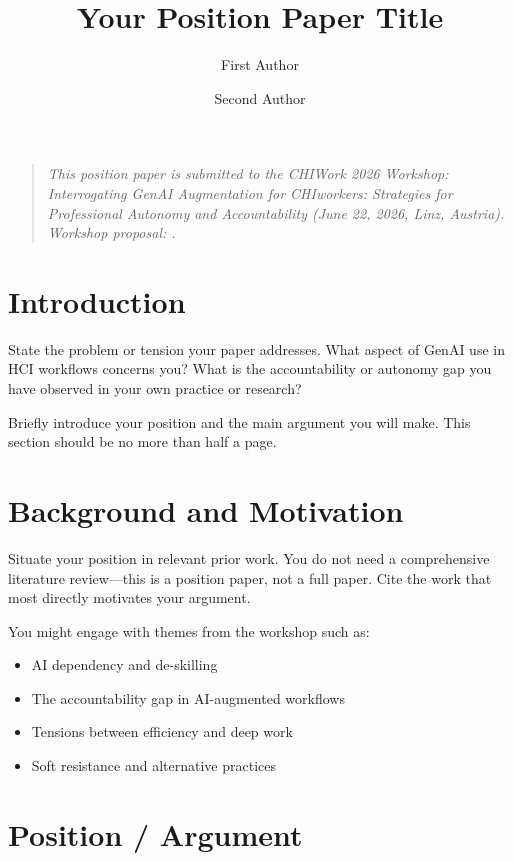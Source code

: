 \documentclass[sigconf]{acmart}
\title{Your Position Paper Title}
\author{First Author}
\affiliation{%
  \institution{Your Institution}
  \city{City}
  \country{Country}}
\author{Second Author}
\affiliation{%
  \institution{Second Institution}
  \city{City}
  \country{Country}}
\newcommand{\workshopNote}{%
  \begin{quote}
    \small\itshape
    This position paper is submitted to the CHIWork 2026 Workshop:
    \emph{Interrogating GenAI Augmentation for CHIworkers:
    Strategies for Professional Autonomy and Accountability}
    (June 22, 2026, Linz, Austria).
    Workshop proposal: \cite{sandhaus2026interrogating}.
  \end{quote}%
}
\begin{document}
\maketitle

\workshopNote

\section{Introduction}

State the problem or tension your paper addresses. What aspect of
GenAI use in HCI workflows concerns you? What is the accountability
or autonomy gap you have observed in your own practice or research?

Briefly introduce your position and the main argument you will make.
This section should be no more than half a page.


\section{Background and Motivation}

Situate your position in relevant prior work. You do not need a
comprehensive literature review—this is a position paper, not a full
paper. Cite the work that most directly motivates your argument.

You might engage with themes from the workshop such as:
\begin{itemize}
  \item AI dependency and de-skilling \cite{sandhaus2026interrogating}
  \item The accountability gap in AI-augmented workflows
  \item Tensions between efficiency and deep work
  \item Soft resistance and alternative practices
\end{itemize}


\section{Position / Argument}
\end{document}
